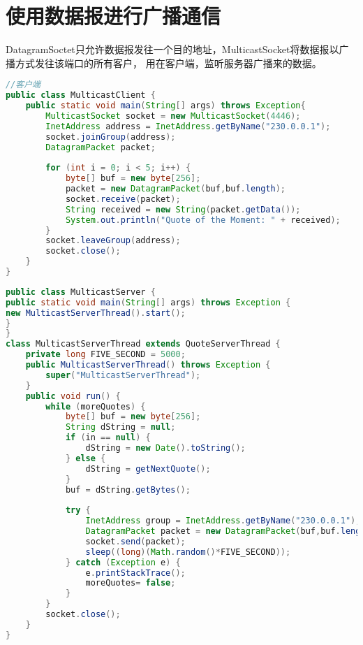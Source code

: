 \section{使用数据报进行广播通信}
DatagramSoctet只允许数据报发往一个目的地址，MulticastSocket将数据报以广播方式发往该端口的所有客户，
用在客户端，监听服务器广播来的数据。
\begin{lstlisting}[language=java]
//客户端
public class MulticastClient {
	public static void main(String[] args) throws Exception{
		MulticastSocket socket = new MulticastSocket(4446);
		InetAddress address = InetAddress.getByName("230.0.0.1");
		socket.joinGroup(address);
		DatagramPacket packet;
		
		for (int i = 0; i < 5; i++) {
			byte[] buf = new byte[256];
			packet = new DatagramPacket(buf,buf.length);
			socket.receive(packet);
			String received = new String(packet.getData());
			System.out.println("Quote of the Moment: " + received);
		}
		socket.leaveGroup(address);
		socket.close();
	}
}
\end{lstlisting}
\begin{lstlisting}[language=java]
public class MulticastServer {
public static void main(String[] args) throws Exception {
new MulticastServerThread().start();
}
}
class MulticastServerThread extends QuoteServerThread {
	private long FIVE_SECOND = 5000;
	public MulticastServerThread() throws Exception {
		super("MulticastServerThread");
	}
	public void run() {
		while (moreQuotes) {
			byte[] buf = new byte[256];
			String dString = null;
			if (in == null) {
				dString = new Date().toString();
			} else {
				dString = getNextQuote();
			}
			buf = dString.getBytes();
			
			try {
				InetAddress group = InetAddress.getByName("230.0.0.1");
				DatagramPacket packet = new DatagramPacket(buf,buf.length,group,4446);
				socket.send(packet);
				sleep((long)(Math.random()*FIVE_SECOND));
			} catch (Exception e) {
				e.printStackTrace();
				moreQuotes= false;
			}
		}
		socket.close();
	}
}
\end{lstlisting}

